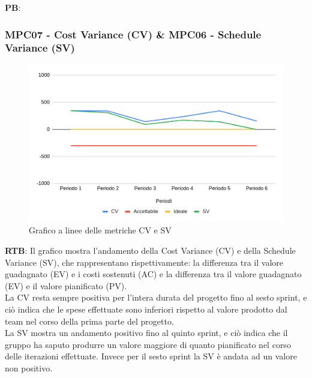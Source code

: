 \documentclass[10pt]{article}
\begin{document}
\begin{justify}
\noindent
\textbf{PB}:


\subsubsection{MPC07 - Cost Variance (CV) \& MPC06 - Schedule Variance (SV)}%

\begin{figure}[H]
  \centering
  \includegraphics[width=0.9\linewidth]{CV-SV.png}
  \caption{Grafico a linee delle metriche CV e SV}
  \label{fig:CV-SVchart}
\end{figure}

\textbf{RTB}: Il grafico mostra l'andamento  della Cost Variance (CV) e della Schedule Variance (SV), che rappresentano rispettivamente: 
la differenza tra il valore guadagnato (EV) e i costi sostenuti (AC) e la differenza tra il valore guadagnato (EV) e il valore pianificato (PV).\\
La CV resta sempre positiva per l'intera durata del progetto fino al sesto sprint, e ciò indica che le spese effettuate sono inferiori rispetto al valore prodotto
dal team nel corso della prima parte del progetto.\\
La SV mostra un andamento positivo fino al quinto sprint, e ciò indica che il gruppo ha saputo produrre un valore maggiore di quanto
pianificato nel corso delle iterazioni effettuate. Invece per il sesto sprint la SV è andata ad un valore non positivo.\\


\end{justify}
\end{document}

